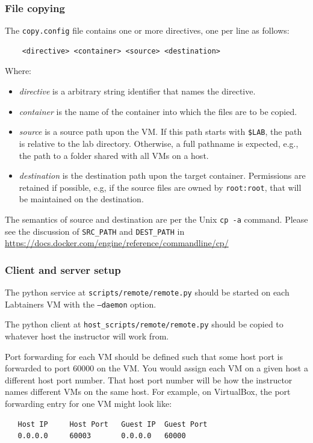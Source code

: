 \documentclass[12pt]{article}
\begin{document}
\subsubsection{File copying}
\noindent The {\tt copy.config} file contains one or more directives, one per line as follows:
\begin{verbatim}
    <directive> <container> <source> <destination>
\end{verbatim} 
\noindent Where:
\begin{itemize}
\item \textit{directive} is a arbitrary string identifier that names the directive.
\item \textit{container} is the name of the container into which the files are to be copied.
\item \textit{source} is a source path upon the VM.  If this path starts with {\tt \$LAB}, the path is relative to
the lab directory.  Otherwise, a full pathname is expected, e.g., the path to a folder shared with all VMs on a host.
\item \textit{destination} is the destination path upon the target container.  Permissions are retained if possible, e.g, if the
source files are owned by {\tt root:root}, that will be maintained on the destination.
\end{itemize}
\noindent The semantics of source and destination are per the Unix {\tt cp -a} command.  Please see the discussion of {\tt SRC\_PATH} 
and {\tt DEST\_PATH} in \url{https://docs.docker.com/engine/reference/commandline/cp/}

\subsubsection{Client and server setup}
The python service at {\tt scripts/remote/remote.py} should be started on each Labtainers VM with the {\tt --daemon} option.

The python client at {\tt host\_scripts/remote/remote.py} should be copied to whatever host the instructor will work from.

Port forwarding for each VM should be defined such that some host port is forwarded to port 60000 on the VM.  You would assign
each VM on a given host a different host port number. That host port number will be how the instructor names different VMs on the same host.
For example, on VirtualBox, the port forwarding entry for one VM might look like:
\begin{verbatim}
   Host IP     Host Port   Guest IP  Guest Port
   0.0.0.0     60003       0.0.0.0   60000
\end{verbatim}
\end{document}
